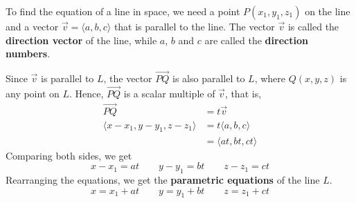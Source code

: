 \documentclass{report}
\begin{document}
To find the equation of a line in space, we need a point $P(x_1, y_1, z_1)$ on
the line and a vector $\vec{v} = \langle a, b, c \rangle$ that is parallel to
the line. The vector $\vec{v}$ is called the \textbf{direction vector} of the
line, while $a$, $b$ and $c$ are called the \textbf{direction numbers}.

Since $\vec{v}$ is parallel to $L$, the vector $\overrightarrow{PQ}$ is also
parallel to $L$, where $Q(x, y, z)$ is any point on $L$. Hence,
$\overrightarrow{PQ}$ is a scalar multiple of $\vec{v}$, that is,
\begin{align*}
    \overrightarrow{PQ}                       & = t\vec{v}                   \\
    \langle x - x_1, y - y_1, z - z_1 \rangle & = t\langle a, b, c \rangle   \\
                                              & = \langle at, bt, ct \rangle
\end{align*}
Comparing both sides, we get \[x - x_1 = at \qquad y - y_1 = bt \qquad z - z_1 = ct\]
Rearranging the equations, we get the \textbf{parametric equations} of the line
$L$. \[x = x_1 + at \qquad y = y_1 + bt \qquad z = z_1 + ct\]
\end{document}
